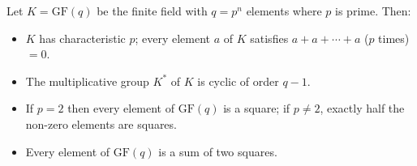 Let $K = \mathrm{GF}(q)$ be the finite field with $q = p^n$ elements where $p$ is prime. Then:
\begin{itemize}
\item[(i)] $K$ has characteristic $p$; every element $a$ of $K$ satisfies $a + a + \cdots + a$ ($p$ times) $= 0$.
\item[(ii)] The multiplicative group $K^*$ of $K$ is cyclic of order $q-1$.
\item[(iii)] If $p=2$ then every element of $\mathrm{GF}(q)$ is a square; if $p \neq 2$, exactly half the non-zero elements are squares.
\item[(iv)] Every element of $\mathrm{GF}(q)$ is a sum of two squares.
\end{itemize}
